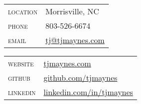 \vspace{0.1in}
\begin{multicols}{2}
  \setlength{\parskip}{0pt}
  \begin{tabularx}{\linewidth}{@{}l X@{}}
    \textsc{location}    &\small{Morrisville, NC}\\
    \textsc{phone}       &\small{803-526-6674}\\
    \textsc{email}       &\href{mailto:tj@tjmaynes.com}{tj@tjmaynes.com}\\
  \end{tabularx}

  \columnbreak

  \begin{tabularx}{\linewidth}{@{}l X@{}}
    \textsc{website}     &\href{https://tjmaynes.com}{tjmaynes.com}\\
    \textsc{github}      &\href{https://github.com/tjmaynes}{github.com/tjmaynes}\\
    \textsc{linkedin}    &\href{https://linkedin.com/in/tjmaynes}{linkedin.com/in/tjmaynes}\\
  \end{tabularx}
\end{multicols}
